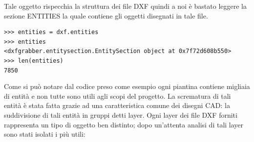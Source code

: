 \documentclass[12pt]{report}
\begin{document}
\vspace{5mm} %

Tale oggetto rispecchia la struttura dei file DXF quindi a noi è bastato leggere la sezione ENTITIES la quale contiene gli oggetti disegnati in tale file.
\begin{lstlisting}[label=codice,caption=Salvataggio delle entità di un file DXF, frame=single]
>>> entities = dxf.entities
>>> entities
<dxfgrabber.entitysection.EntitySection object at 0x7f72d608b550>
>>> len(entities)
7850
\end{lstlisting}

\vspace{5mm} %

Come si può notare dal codice preso come esempio ogni piantina contiene migliaia di entità e non tutte sono utili agli scopi del progetto. La scrematura di tali entità è stata fatta grazie ad una caratteristica comune dei disegni CAD: la suddivisione di tali entità in gruppi detti layer. Ogni layer dei file DXF forniti rappresenta un tipo di oggetto ben distinto; dopo un'attenta analisi di tali layer sono stati isolati i più utili:
\end{document}
